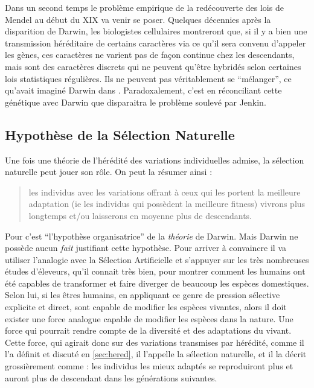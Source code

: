 Dans un second temps le problème empirique de la redécouverte des lois de Mendel  au début du XIX va venir se poser. Quelques décennies après la disparition de Darwin, les biologistes cellulaires montreront que, si il y a bien une transmission héréditaire de certains caractères via ce qu'il sera convenu d'appeler les gènes, ces caractères ne varient pas de façon continue chez les descendants, mais sont des caractères discrets qui ne peuvent qu'être hybridés selon certaines lois statistiques régulières. Ils ne peuvent pas véritablement se ``mélanger'', ce qu'avait imaginé Darwin dans \cite{darwin1868variation}. Paradoxalement, c'est en réconciliant cette génétique avec Darwin que disparaitra le problème soulevé par Jenkin. 

\subsection{Hypothèse de la Sélection Naturelle}\label{sec:SN}
Une fois une théorie de l'hérédité des variations individuelles admise, la sélection naturelle peut jouer son rôle. On peut la résumer ainsi :
\begin{quote} les individus avec les variations offrant à ceux qui les portent la meilleure adaptation (ie les individus qui possèdent la meilleure fitness) vivrons plus longtemps et/ou laisserons en moyenne plus de descendants.\end{quote}

	Pour \cite[p. 22]{gayon1991darwinetlapresdarwin} c'est ``l'hypothèse organisatrice'' de la \emph{théorie} de Darwin. Mais Darwin ne possède aucun \emph{fait} justifiant cette hypothèse. Pour arriver à convaincre il va utiliser l'analogie avec la Sélection Artificielle et s'appuyer sur les très nombreuses études d'éleveurs, qu'il connait très bien, pour montrer comment les humains ont été capables de transformer et faire diverger de beaucoup les espèces domestiques. Selon lui, si les êtres humains, en appliquant ce genre de pression sélective explicite et direct, sont capable de modifier les espèces vivantes, alors il doit exister une force analogue capable de modifier les espèces dans la nature. Une force qui pourrait rendre compte de la diversité et des adaptations du vivant. Cette force, qui agirait donc sur des variations transmises par hérédité, comme il l'a définit et discuté en \ref{sec:hered}, il l'appelle la sélection naturelle, et il la décrit grossièrement comme : les individus les mieux adaptés se reproduiront plus et auront plus de descendant dans les générations suivantes. 


